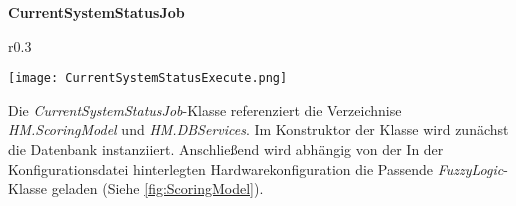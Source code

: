 \textbf{CurrentSystemStatusJob}\\
\begin{wrapfigure}{r}{0.3\textwidth}
    \vspace{-1.2cm}
    \begin{center}
      \texttt{[image: CurrentSystemStatusExecute.png]}
    \end{center}
    \vspace{-0.5cm}
    \caption{}
    \label{fig:CurrentSystemStatusExecuteJobExecute}
  \end{wrapfigure}
Die \textit{CurrentSystemStatusJob}-Klasse referenziert die Verzeichnise \textit{HM.ScoringModel} und \textit{HM.DBServices}. Im Konstruktor der Klasse wird zunächst die Datenbank instanziiert. Anschließend wird abhängig von der In der Konfigurationsdatei hinterlegten Hardwarekonfiguration die Passende \textit{FuzzyLogic}-Klasse geladen (Siehe \ref{fig:ScoringModel}).

